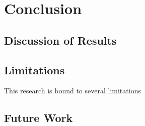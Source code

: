 \chapter{Conclusion}
\section{Discussion of Results}
\section{Limitations}
This research is bound to several limitations
\section{Future Work}